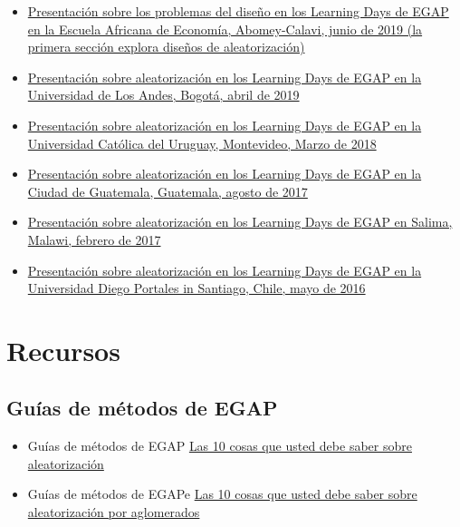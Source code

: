 \documentclass[
  12pt,
  spanish,
]{book}
\begin{document}
\begin{itemize}
\item
  \href{https://egap.github.io/learningdays-resources/Slides/Examples/threats-benin.pdf}{Presentación sobre los problemas del diseño en los Learning Days de EGAP en la Escuela Africana de Economía, Abomey-Calavi, junio de 2019 (la primera sección explora diseños de aleatorización)}
\item
  \href{https://egap.github.io/learningdays-resources/Slides/Examples/randomization-bogota.pdf}{Presentación sobre aleatorización en los Learning Days de EGAP en la Universidad de Los Andes, Bogotá, abril de 2019}
\item
  \href{https://egap.github.io/learningdays-resources/Slides/Examples/randomization-montevideo.pdf}{Presentación sobre aleatorización en los Learning Days de EGAP en la Universidad Católica del Uruguay, Montevideo, Marzo de 2018}
\item
  \href{https://egap.github.io/learningdays-resources/Slides/Examples/randomization-guatemala.pdf}{Presentación sobre aleatorización en los Learning Days de EGAP en la Ciudad de Guatemala, Guatemala, agosto de 2017}
\item
  \href{https://egap.github.io/learningdays-resources/Slides/Examples/randomization-malawi.pdf}{Presentación sobre aleatorización en los Learning Days de EGAP en Salima, Malawi, febrero de 2017}
\item
  \href{https://egap.github.io/learningdays-resources/Slides/Examples/randomization-santiago.pdf}{Presentación sobre aleatorización en los Learning Days de EGAP en la Universidad Diego Portales in Santiago, Chile, mayo de 2016}
\end{itemize}

\hypertarget{recursos-2}{%
\section{Recursos}\label{recursos-2}}

\hypertarget{guuxedas-de-muxe9todos-de-egap-1}{%
\subsection{Guías de métodos de EGAP}\label{guuxedas-de-muxe9todos-de-egap-1}}

\begin{itemize}
\item
  Guías de métodos de EGAP \href{https://egap.org/resource/10-things-to-know-about-randomization/}{Las 10 cosas que usted debe saber sobre aleatorización}
\item
  Guías de métodos de EGAPe \href{https://egap.org/resource/10-things-to-know-about-cluster-randomization/}{Las 10 cosas que usted debe saber sobre aleatorización por aglomerados}
\end{itemize}
\end{document}
